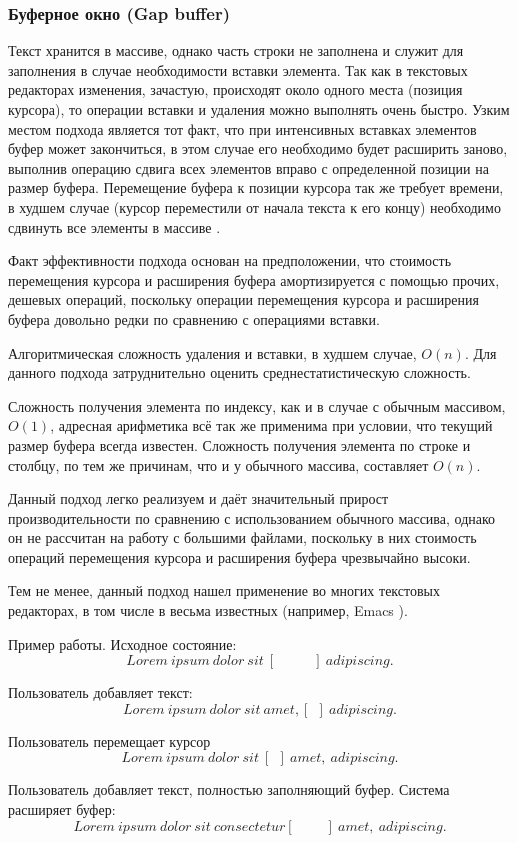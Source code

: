 \documentclass{fefu}
\begin{document}
			\subsubsection{Буферное окно (Gap buffer)}
				\par Текст хранится в массиве, однако часть строки не заполнена и служит для
				заполнения в случае необходимости вставки элемента. Так как в текстовых
				редакторах изменения, зачастую, происходят около одного места (позиция 
				курсора), то операции вставки и удаления можно выполнять очень быстро.
				Узким местом подхода является тот факт, что при интенсивных вставках элементов
				буфер может закончиться, в этом случае его необходимо будет расширить заново,
				выполнив операцию сдвига всех элементов вправо с определенной позиции на размер
				буфера. Перемещение буфера к позиции курсора так же требует времени, в худшем 
				случае (курсор переместили от начала текста к его концу) необходимо сдвинуть
				все элементы в массиве \cite{GapBufferArticle}.
				\par Факт эффективности подхода основан на предположении, что стоимость
				перемещения курсора и расширения буфера амортизируется с помощью прочих,
				дешевых операций, поскольку операции перемещения курсора и расширения буфера
				довольно редки по сравнению с операциями вставки.
				\par Алгоритмическая сложность удаления и вставки, в худшем случае, $O(n)$. Для
				данного подхода затруднительно оценить среднестатистическую сложность.
				\par Сложность получения элемента по индексу, как и в случае с обычным 
				массивом, $O(1)$, адресная арифметика всё так же применима при условии, что
				текущий размер буфера всегда известен. Сложность получения элемента по строке и
				столбцу, по тем же причинам, что и у обычного массива, составляет $O(n)$.
				\par Данный подход легко реализуем и даёт значительный прирост
				производительности по сравнению с использованием обычного массива, однако он не
				рассчитан на работу с большими файлами, поскольку в них стоимость операций 
				перемещения курсора и расширения буфера чрезвычайно высоки.
				\par Тем не менее, данный подход нашел применение во многих текстовых
				редакторах, в том числе в весьма известных (например, Emacs
				\cite{EmacsGapBuffer}).
				\par Пример работы. Исходное состояние:
				$$Lorem~ipsum~dolor~sit~[~~~~~~~~~~~~]~adipiscing.$$
				\par Пользователь добавляет текст:
				$$Lorem~ipsum~dolor~sit~amet,[~~]~adipiscing.$$
				\par Пользователь перемещает курсор
				$$Lorem~ipsum~dolor~sit~[~~]~amet,~adipiscing.$$
				\par Пользователь добавляет текст, полностью заполняющий буфер. Система
				расширяет буфер:
				$$Lorem~ipsum~dolor~sit~consectetur[~~~~~~~~~~]~amet,~adipiscing.$$
\end{document}
